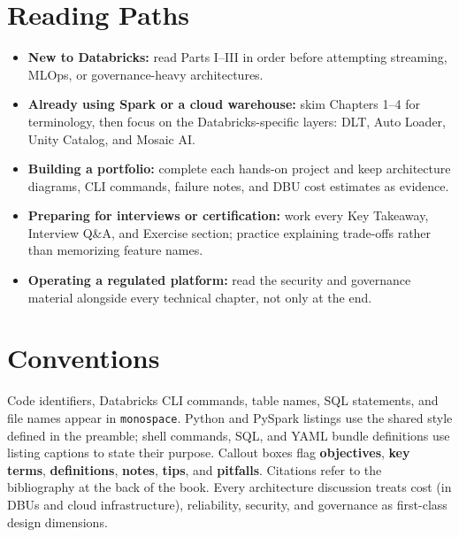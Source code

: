 \section*{Reading Paths}
\begin{itemize}
    \item \textbf{New to Databricks:} read Parts I--III in order before attempting streaming, MLOps, or governance-heavy architectures.
    \item \textbf{Already using Spark or a cloud warehouse:} skim Chapters 1--4 for terminology, then focus on the Databricks-specific layers: DLT, Auto Loader, Unity Catalog, and Mosaic AI.
    \item \textbf{Building a portfolio:} complete each hands-on project and keep architecture diagrams, CLI commands, failure notes, and DBU cost estimates as evidence.
    \item \textbf{Preparing for interviews or certification:} work every Key Takeaway, Interview Q\&A, and Exercise section; practice explaining trade-offs rather than memorizing feature names.
    \item \textbf{Operating a regulated platform:} read the security and governance material alongside every technical chapter, not only at the end.
\end{itemize}

\section*{Conventions}
Code identifiers, Databricks CLI commands, table names, SQL statements, and file names appear in \texttt{monospace}. Python and PySpark listings use the shared style defined in the preamble; shell commands, SQL, and YAML bundle definitions use listing captions to state their purpose. Callout boxes flag \textbf{objectives}, \textbf{key terms}, \textbf{definitions}, \textbf{notes}, \textbf{tips}, and \textbf{pitfalls}. Citations refer to the bibliography at the back of the book. Every architecture discussion treats cost (in DBUs and cloud infrastructure), reliability, security, and governance as first-class design dimensions.
